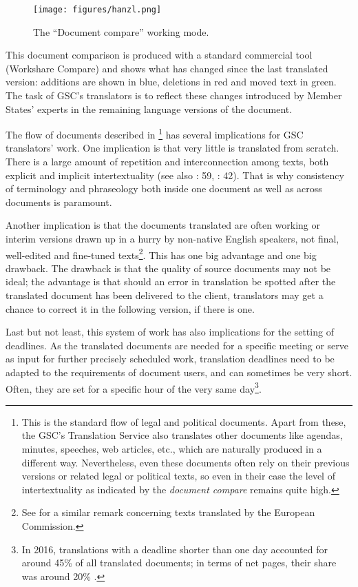 \documentclass[output=paper]{langsci/langscibook}
\begin{document}
\begin{figure}
\texttt{[image: figures/hanzl.png]}
\caption{The ``Document compare'' working mode.}
\label{fig:hanzl:1}
\end{figure}

   
This document comparison is produced with a standard commercial tool (Workshare Compare) and shows what has changed since the last translated version: additions are shown in blue, deletions in red and moved text in green. The task of GSC's translators is to reflect these changes introduced by Member States' experts in the remaining language versions of the document.

The flow of documents described in \footnote{This is the standard flow of legal and political documents. Apart from these, the GSC's Translation Service also translates other documents like agendas, minutes, speeches, web articles, etc., which are naturally produced in a different way. Nevertheless, even these documents often rely on their previous versions or related legal or political texts, so even in their case the level of intertextuality as indicated by the \textit{document compare} remains quite high.} has several implications for GSC translators' work. One implication is that very little is translated from scratch. There is a large amount of repetition and interconnection among texts, both explicit and implicit intertextuality (see also \citealt{Koskinen2000}: 59, \citealt{Robertson2015}: 42). That is why consistency of terminology and phraseology both inside one document as well as across documents is paramount.

Another implication is that the documents translated are often working or interim versions drawn up in a hurry by non-native English speakers, not final, well-edited and fine-tuned texts\footnote{See \citet{Stefaniak2013} for a similar remark concerning texts translated by the European Commission.}. This has one big advantage and one big drawback. The drawback is that the quality of source documents may not be ideal; the advantage is that should an error in translation be spotted after the translated document has been delivered to the client, translators may get a chance to correct it in the following version, if there is one.

Last but not least, this system of work has also implications for the setting of deadlines. As the translated documents are needed for a specific meeting or serve as input for further precisely scheduled work, translation deadlines need to be adapted to the requirements of document users, and can sometimes be very short. Often, they are set for a specific hour of the very same day\footnote{In 2016, translations with a deadline shorter than one day accounted for around 45\% of all translated documents; in terms of net pages, their share was around 20\% \citep{Council2017}.}.
\end{document}
